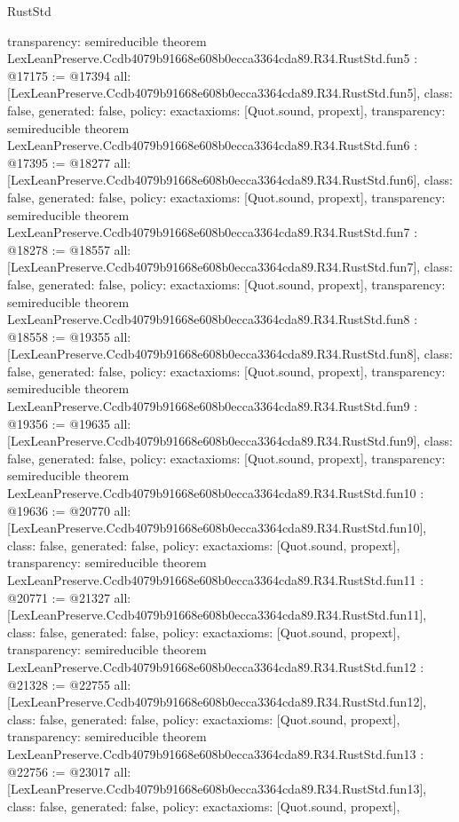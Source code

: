 \begin{lexlean}{RustStd}
\begin{coremodule}
{  transparency: semireducible
}
theorem LexLeanPreserve.Ccdb4079b91668e608b0ecca3364cda89.R34.RustStd.fun5 : @17175 := @17394 {
  all: [LexLeanPreserve.Ccdb4079b91668e608b0ecca3364cda89.R34.RustStd.fun5],
  class: false,
  generated: false,
  policy: exact{axioms: [Quot.sound, propext]},
  transparency: semireducible
}
theorem LexLeanPreserve.Ccdb4079b91668e608b0ecca3364cda89.R34.RustStd.fun6 : @17395 := @18277 {
  all: [LexLeanPreserve.Ccdb4079b91668e608b0ecca3364cda89.R34.RustStd.fun6],
  class: false,
  generated: false,
  policy: exact{axioms: [Quot.sound, propext]},
  transparency: semireducible
}
theorem LexLeanPreserve.Ccdb4079b91668e608b0ecca3364cda89.R34.RustStd.fun7 : @18278 := @18557 {
  all: [LexLeanPreserve.Ccdb4079b91668e608b0ecca3364cda89.R34.RustStd.fun7],
  class: false,
  generated: false,
  policy: exact{axioms: [Quot.sound, propext]},
  transparency: semireducible
}
theorem LexLeanPreserve.Ccdb4079b91668e608b0ecca3364cda89.R34.RustStd.fun8 : @18558 := @19355 {
  all: [LexLeanPreserve.Ccdb4079b91668e608b0ecca3364cda89.R34.RustStd.fun8],
  class: false,
  generated: false,
  policy: exact{axioms: [Quot.sound, propext]},
  transparency: semireducible
}
theorem LexLeanPreserve.Ccdb4079b91668e608b0ecca3364cda89.R34.RustStd.fun9 : @19356 := @19635 {
  all: [LexLeanPreserve.Ccdb4079b91668e608b0ecca3364cda89.R34.RustStd.fun9],
  class: false,
  generated: false,
  policy: exact{axioms: [Quot.sound, propext]},
  transparency: semireducible
}
theorem LexLeanPreserve.Ccdb4079b91668e608b0ecca3364cda89.R34.RustStd.fun10 : @19636 := @20770 {
  all: [LexLeanPreserve.Ccdb4079b91668e608b0ecca3364cda89.R34.RustStd.fun10],
  class: false,
  generated: false,
  policy: exact{axioms: [Quot.sound, propext]},
  transparency: semireducible
}
theorem LexLeanPreserve.Ccdb4079b91668e608b0ecca3364cda89.R34.RustStd.fun11 : @20771 := @21327 {
  all: [LexLeanPreserve.Ccdb4079b91668e608b0ecca3364cda89.R34.RustStd.fun11],
  class: false,
  generated: false,
  policy: exact{axioms: [Quot.sound, propext]},
  transparency: semireducible
}
theorem LexLeanPreserve.Ccdb4079b91668e608b0ecca3364cda89.R34.RustStd.fun12 : @21328 := @22755 {
  all: [LexLeanPreserve.Ccdb4079b91668e608b0ecca3364cda89.R34.RustStd.fun12],
  class: false,
  generated: false,
  policy: exact{axioms: [Quot.sound, propext]},
  transparency: semireducible
}
theorem LexLeanPreserve.Ccdb4079b91668e608b0ecca3364cda89.R34.RustStd.fun13 : @22756 := @23017 {
  all: [LexLeanPreserve.Ccdb4079b91668e608b0ecca3364cda89.R34.RustStd.fun13],
  class: false,
  generated: false,
  policy: exact{axioms: [Quot.sound, propext]},
}
\end{coremodule}
\end{lexlean}
